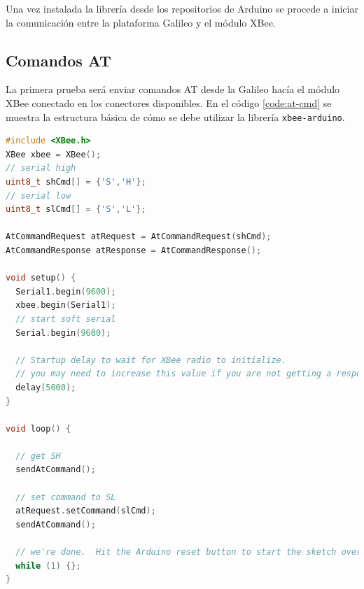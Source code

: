 \documentclass[11pt,oneside,spanish,a4paper]{article}
\begin{document}
Una vez instalada la librería desde los repositorios de Arduino se
procede a iniciar la comunicación entre la plataforma Galileo y el
módulo XBee. 

\subsection{Comandos AT}

La primera prueba será enviar comandos AT desde la Galileo hacía el
módulo XBee conectado en los conectores disponibles. En el código
\ref{code:at-cmd} se muestra la estructura básica de cómo se debe
utilizar la librería \texttt{xbee-arduino}. 
\begin{lstlisting}[basicstyle=\ttfamily\small, language= C++,
  caption={Ejemplo \texttt{AtCommand}},label=code:at-cmd, frame=single]
#include <XBee.h>
XBee xbee = XBee();
// serial high
uint8_t shCmd[] = {'S','H'};
// serial low
uint8_t slCmd[] = {'S','L'};

AtCommandRequest atRequest = AtCommandRequest(shCmd);
AtCommandResponse atResponse = AtCommandResponse();

void setup() { 
  Serial1.begin(9600);
  xbee.begin(Serial1);
  // start soft serial
  Serial.begin(9600);

  // Startup delay to wait for XBee radio to initialize.
  // you may need to increase this value if you are not getting a response
  delay(5000);
}

void loop() {

  // get SH
  sendAtCommand();
    
  // set command to SL
  atRequest.setCommand(slCmd);  
  sendAtCommand();
   
  // we're done.  Hit the Arduino reset button to start the sketch over
  while (1) {};
}
\end{lstlisting}  
\end{document}
